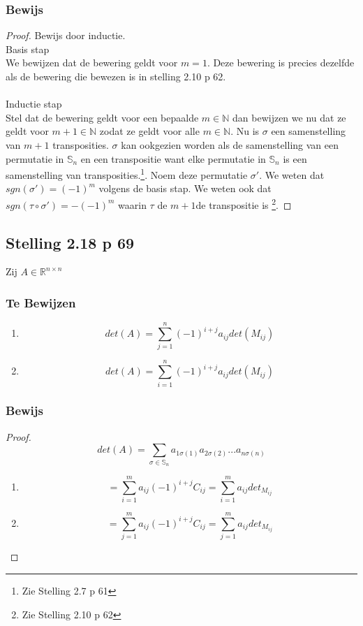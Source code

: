 \documentclass[lineaire_algebra_oplossingen.tex]{subfiles}
\begin{document}
\subsubsection*{Bewijs}
\begin{proof}
Bewijs door inductie.\\
\textsf{Basis stap}\\
We bewijzen dat de bewering geldt voor $m=1$. Deze bewering is precies dezelfde als de bewering die bewezen is in stelling 2.10 p 62.\\\\
\textsf{Inductie stap}\\
Stel dat de bewering geldt voor een bepaalde $m \in \mathbb{N}$ dan bewijzen we nu dat ze geldt voor $m+1 \in \mathbb{N}$ zodat ze geldt voor alle $m \in \mathbb{N}$.
Nu is $\sigma$ een samenstelling van $m+1$ transposities. $\sigma$ kan ookgezien worden als de samenstelling van een permutatie in $\mathbb{S}_n$ en een transpositie want elke permutatie in $\mathbb{S}_n$ is een samenstelling van transposities.\footnote{Zie Stelling 2.7 p 61}. Noem deze permutatie $\sigma'$. We weten dat $sgn(\sigma') = (-1)^m$ volgens de basis stap. We weten ook dat $sgn(\tau \circ \sigma') = -(-1)^m$ waarin $\tau$ de $m+1$de transpositie is \footnote{Zie Stelling 2.10 p 62}.
\end{proof}


\subsection{Stelling 2.18 p 69}
\label{2.18}
Zij $A \in \mathbb{R}^{n\times n}$

\subsubsection*{Te Bewijzen}
\begin{enumerate}
\item
\[
det(A) = \sum_{j=1}^n(-1)^{i+j}a_{ij}det(M_{ij})
\]
\item
\[
det(A) = \sum_{i=1}^n(-1)^{i+j}a_{ij}det(M_{ij})
\]
\end{enumerate}

\subsubsection*{Bewijs}
\begin{proof}
\[
det(A) = \sum_{\sigma \in \mathbb{S}_n} a_{1\sigma(1)}a_{2\sigma(2)}...a_{n\sigma(n)}
\]
\begin{enumerate}
\item
\[
= \sum_{i=1}^m a_{ij} (-1)^{i+j}C_{ij}
= \sum_{i=1}^m a_{ij} det_{M_{ij}}
\]
\item
\[
= \sum_{j=1}^m a_{ij} (-1)^{i+j}C_{ij}
= \sum_{j=1}^m a_{ij} det_{M_{ij}}
\]
\end{enumerate}
\end{proof}
\end{document}
